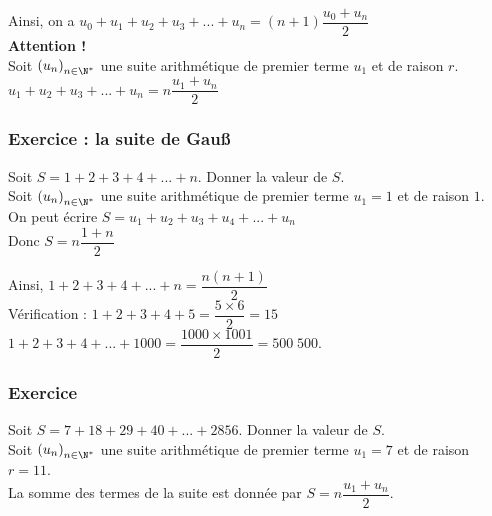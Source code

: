 \vspace*{.3cm} 

Ainsi, on a $u_0 + u_1 + u_2 + u_3 + ... + u_n = \left(n+1\right) \dfrac{u_0 + u_n}{2}$ \\

\textbf{Attention !} \\

Soit $\left(u_n\right)_{n\in \N^*}$ une suite arithmétique de premier terme $u_1$ et de raison $r$. \\

$u_1 + u_2 + u_3 + ... + u_n = n\dfrac{u_1 + u_n}{2}$

\newpage

\subsubsection{Exercice  : la suite de Gauß}

Soit $S = 1 + 2 + 3 + 4 + ... + n$. Donner la valeur de $S$. \\

Soit $\left(u_n\right)_{n \in \N^*}$ une suite arithmétique de premier terme $u_1 = 1$ et de raison $1$. \\

On peut écrire $ S = u_1 + u_2 + u_3 + u_4 + ... + u_n$ \\

Donc $S = n\dfrac{1+n}{2}$ 

Ainsi, $1 + 2+ 3 + 4 + ... + n = \dfrac{n\left(n+1\right)}{2}$ \\

Vérification : $1 + 2 + 3 + 4 + 5 = \dfrac{5 \times 6}{2} = 15$ \\

$1 + 2 + 3 + 4 + ... + 1000 = \dfrac{1000 \times 1001}{2} = 500\; 500$.

\subsubsection{Exercice }

Soit $S = 7 + 18 + 29 + 40 + ... + 2856$. Donner la valeur de $S$. \\

Soit $\left(u_n\right)_{n \in \N^*}$ une suite arithmétique de premier terme $u_1 = 7$ et de raison $r = 11$. \\

La somme des termes de la suite est donnée par $S = n\dfrac{u_1+u_n}{2}$. \\

